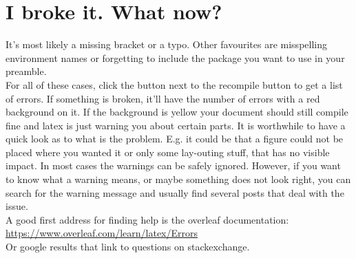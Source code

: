\section{I broke it. What now?}

It's most likely a missing bracket or a typo.
Other favourites are misspelling environment names or forgetting to include the package you want to use in your preamble.\\
For all of these cases, click the button next to the recompile button to get a list of errors. If something is broken, it'll have the number of errors with a red background on it. If the background is yellow your document should still compile fine and latex is just warning you about certain parts. It is worthwhile to have a quick look as to what is the problem. E.g. it could be that a figure could not be placed where you wanted it or only some lay-outing stuff, that has no visible impact. In most cases the warnings can be safely ignored. However, if you want to know what a warning means, or maybe something does not look right, you can search for the warning message and usually find several posts that deal with the issue.\\
A good first address for finding help is the overleaf documentation:\\
\url{https://www.overleaf.com/learn/latex/Errors}\\
Or google results that link to questions on stackexchange.